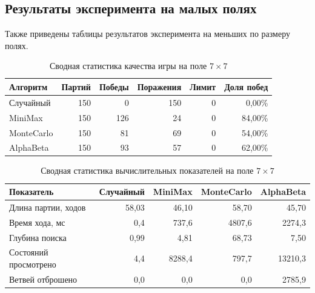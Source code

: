 \documentclass[a4paper,12pt]{diplom}
\newcommand{\goodcell}[1]{\cellcolor{WinHigh}#1}
\newcommand{\midcell}[1]{\cellcolor{WinMid}#1}
\newcommand{\badcell}[1]{\cellcolor{WinLow}#1}
\newcommand{\neutralcell}[1]{\cellcolor{MetricNeutral}#1}
\begin{document}
\subsection{Результаты эксперимента на малых полях}

Также приведены таблицы результатов эксперимента на меньших по размеру полях.

\begin{table}[H]
\centering
\caption{Сводная статистика качества игры на поле $7\times7$}
\label{tab:summary_quality_7}
\begin{tabular}{lrrrrr}
\toprule
Алгоритм & Партий & Победы & Поражения & Лимит & Доля побед \\
\midrule
Случайный  & \neutralcell{150} & \badcell{0}   & \badcell{150} & \neutralcell{0} & \badcell{0,00\%} \\
MiniMax    & \neutralcell{150} & \goodcell{126} & \goodcell{24} & \neutralcell{0} & \goodcell{84,00\%} \\
MonteCarlo & \neutralcell{150} & \midcell{81}   & \midcell{69} & \neutralcell{0} & \midcell{54,00\%} \\
AlphaBeta  & \neutralcell{150} & \midcell{93}   & \midcell{57} & \neutralcell{0} & \midcell{62,00\%} \\
\bottomrule
\end{tabular}
\end{table}

\begin{table}[H]
\centering
\caption{Сводная статистика вычислительных показателей на поле $7\times7$}
\label{tab:summary_cost_7}
\begin{tabular}{lrrrr}
\toprule
Показатель & Случайный & MiniMax & MonteCarlo & AlphaBeta \\
\midrule
Длина партии, ходов & \badcell{58,03} & \goodcell{46,10} & \badcell{58,70} & \goodcell{45,70} \\
Время хода, мс & \goodcell{0,4} & \goodcell{737,6} & \badcell{4807,6} & \midcell{2274,3} \\
Глубина поиска & \badcell{0,99} & \midcell{4,81} & \goodcell{68,73} & \midcell{7,50} \\
Состояний просмотрено & \goodcell{4,4} & \midcell{8288,4} & \goodcell{797,7} & \badcell{13210,3} \\
Ветвей отброшено & \neutralcell{0,0} & \neutralcell{0,0} & \neutralcell{0,0} & \goodcell{2785,9} \\
\bottomrule
\end{tabular}
\end{table}
\end{document}
